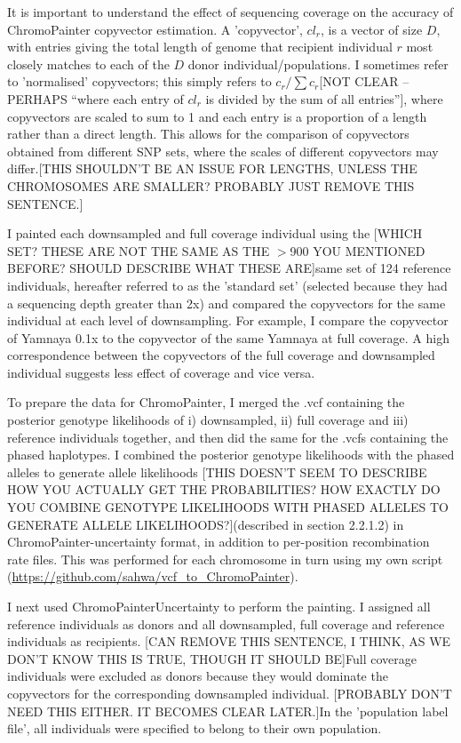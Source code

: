 It is important to understand the effect of sequencing coverage on the accuracy of ChromoPainter copyvector estimation. {\color{red}A 'copyvector', $cl_{r}$, is a vector of size $D$, with entries giving the total length of genome that recipient individual $r$ most closely matches to each of the $D$ donor individual/populations}. I sometimes refer to 'normalised' copyvectors; this simply refers to $c_{r} / \sum c_{r}${\color{red}[NOT CLEAR -- PERHAPS ``where each entry of $cl_r$ is divided by the sum of all entries'']}, where copyvectors are scaled to sum to 1 and each entry is a proportion of a length rather than a direct length. {\color{red}This allows for the comparison of copyvectors obtained from different SNP sets, where the scales of different copyvectors may differ.[THIS SHOULDN'T BE AN ISSUE FOR LENGTHS, UNLESS THE CHROMOSOMES ARE SMALLER? PROBABLY JUST REMOVE THIS SENTENCE.]}

I painted each downsampled and full coverage individual using the {\color{red}[WHICH SET? THESE ARE NOT THE SAME AS THE $>$900 YOU MENTIONED BEFORE? SHOULD DESCRIBE WHAT THESE ARE]same set of 124 reference individuals}, hereafter referred to as the 'standard set' (selected because they had a sequencing depth greater than 2x) and compared the copyvectors for the same individual at each level of downsampling. {\color{red}For example, I} compare the copyvector of Yamnaya 0.1x to the copyvector of {\color{red}the same} Yamnaya at full coverage. A high correspondence between the copyvectors of the full coverage and downsampled individual suggests less effect of coverage and vice versa. 

To prepare the data for ChromoPainter, I merged the .vcf containing the posterior genotype likelihoods of i) downsampled, ii) full coverage and iii) reference individuals together, and then did the same for the .vcfs containing the phased haplotypes.  I combined the posterior genotype likelihoods with the phased alleles to generate allele likelihoods {\color{red}[THIS DOESN'T SEEM TO DESCRIBE HOW YOU ACTUALLY GET THE PROBABILITIES? HOW EXACTLY DO YOU COMBINE GENOTYPE LIKELIHOODS WITH PHASED ALLELES TO GENERATE ALLELE LIKELIHOODS?](described in section 2.2.1.2)} in ChromoPainter-uncertainty format, in addition to per-position recombination rate files. This was performed for each chromosome in turn using my own script (\url{https://github.com/sahwa/vcf_to_ChromoPainter}).

I next used ChromoPainterUncertainty to perform the painting. I assigned all reference individuals as donors and all downsampled, full coverage and reference individuals as recipients. {\color{red}[CAN REMOVE THIS SENTENCE, I THINK, AS WE DON'T KNOW THIS IS TRUE, THOUGH IT SHOULD BE]Full coverage individuals were excluded as donors because they would dominate the copyvectors for the corresponding downsampled individual.} {\color{red}[PROBABLY DON'T NEED THIS EITHER. IT BECOMES CLEAR LATER.]In the 'population label file', all individuals were specified to belong to their own population. }

